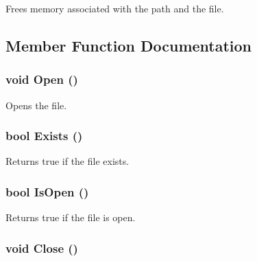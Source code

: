Frees memory associated with the path and the file. 

\subsection{Member Function Documentation}
\hypertarget{classJKBuilder_1_1FileManager_a5e53001785ff30ae485a113b9b8a0ddc}{
\subsubsection[{Open}]{\setlength{\rightskip}{0pt plus 5cm}void Open ()}}
\label{classJKBuilder_1_1FileManager_a5e53001785ff30ae485a113b9b8a0ddc}


Opens the file. \hypertarget{classJKBuilder_1_1FileManager_aa9a207f89881ad3eeb418619bef880ed}{
\subsubsection[{Exists}]{\setlength{\rightskip}{0pt plus 5cm}bool Exists ()}}
\label{classJKBuilder_1_1FileManager_aa9a207f89881ad3eeb418619bef880ed}


Returns true if the file exists. \hypertarget{classJKBuilder_1_1FileManager_a1822528b9d87e3897acff000f0ef4629}{
\subsubsection[{IsOpen}]{\setlength{\rightskip}{0pt plus 5cm}bool IsOpen ()}}
\label{classJKBuilder_1_1FileManager_a1822528b9d87e3897acff000f0ef4629}


Returns true if the file is open. \hypertarget{classJKBuilder_1_1FileManager_a7f7a3199c392465d0767c6506c1af5b4}{
\subsubsection[{Close}]{\setlength{\rightskip}{0pt plus 5cm}void Close ()}}
\label{classJKBuilder_1_1FileManager_a7f7a3199c392465d0767c6506c1af5b4}


